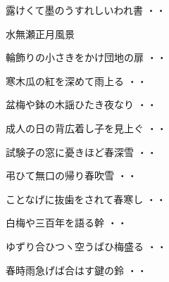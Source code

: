 \vspace{0.6cm}
\begin{shiika}露けくて墨のうすれしいわれ書
\hfill{・・}\end{shiika}
\vspace{0.6cm}
水無瀬正月風景
\begin{shiika}輪飾りの小さきをかけ団地の扉
\hfill{・・}\end{shiika}
\begin{shiika}寒木瓜の紅を深めて雨上る
\hfill{・・}\end{shiika}
\begin{shiika}盆梅や鉢の木謡ひたき夜なり
\hfill{・・}\end{shiika}
\vspace{0.6cm}
\begin{shiika}成人の日の背広着し子を見上ぐ
\hfill{・・}\end{shiika}
\vspace{0.6cm}
\begin{shiika}試験子の窓に憂きほど春深雪
\hfill{・・}\end{shiika}
\vspace{0.6cm}
\begin{shiika}弔ひて無口の帰り春吹雪
\hfill{・・}\end{shiika}
\vspace{0.6cm}
\begin{shiika}ことなげに抜歯をされて春寒し
\hfill{・・}\end{shiika}
\vspace{0.6cm}
\begin{shiika}白梅や三百年を語る幹
\hfill{・・}\end{shiika}
\vspace{0.6cm}
\begin{shiika}ゆずり合ひつヽ空うばひ梅盛る
\hfill{・・}\end{shiika}
\vspace{0.6cm}
\begin{shiika}春時雨急げば合はす鍵の鈴
\hfill{・・}\end{shiika}
\vspace{0.6cm}
